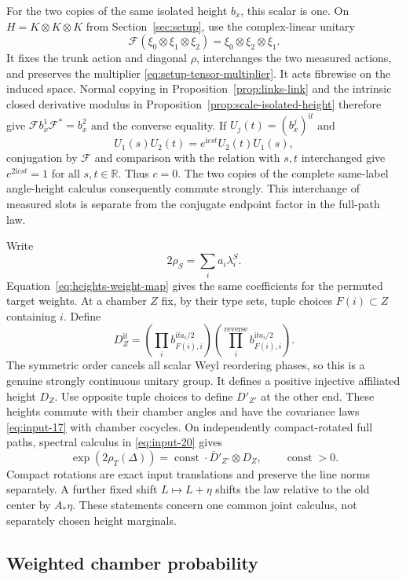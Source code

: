 For the two copies of the same isolated height $b_x$, this scalar is one.
On $H=K\otimes K\otimes K$ from Section~\ref{sec:setup}, use the
complex-linear unitary
\[
 \mathcal F(\xi_0\otimes\xi_1\otimes\xi_2)
   =\xi_0\otimes\xi_2\otimes\xi_1.
\]
It fixes the trunk action and diagonal $\rho$, interchanges the two
measured actions, and preserves the multiplier
\eqref{eq:setup-tensor-multiplier}. It acts fibrewise on the induced
space. Normal copying in Proposition~\ref{prop:links-link} and the
intrinsic closed derivative modulus in
Proposition~\ref{prop:scale-isolated-height} therefore give
$\mathcal F b_x^1\mathcal F^*=b_x^2$ and the converse equality.
If $U_j(t)=(b_x^j)^{\mathrm it}$ and
\[
 U_1(s)U_2(t)=e^{\mathrm icst}U_2(t)U_1(s),
\]
conjugation by $\mathcal F$ and comparison with the relation with $s,t$
interchanged give $e^{2\mathrm icst}=1$ for all $s,t\in\mathbb R$.
Thus $c=0$. The two copies of the complete same-label angle-height
calculus consequently commute strongly. This interchange of measured
slots is separate from the conjugate endpoint factor in the full-path
law.

Write
\[
 2\rho_S=\sum_i a_i\lambda_i^S.
\]
Equation~\eqref{eq:heights-weight-map} gives the same coefficients for the
permuted target weights.  At a chamber $Z$ fix, by their type sets, tuple
choices $F(i)\subset Z$ containing $i$.  Define
\[
 D_Z^{\mathrm it}=
 \left(\prod_i b_{F(i),i}^{\mathrm it a_i/2}\right)
 \left(\prod_i^{\mathrm{reverse}} b_{F(i),i}^{\mathrm it a_i/2}\right).
\]
The symmetric order cancels all scalar Weyl reordering phases, so this is
a genuine strongly continuous unitary group.  It defines a positive
injective affiliated height $D_Z$.  Use opposite tuple choices to define
$D'_{Z'}$ at the other end.  These heights commute with their chamber
angles and have the covariance laws \eqref{eq:input-17} with chamber
cocycles.  On independently compact-rotated full paths, spectral calculus
in \eqref{eq:input-20} gives
\begin{equation}\label{eq:input-21}
 \exp(2\rho_T(\Delta))
 =\operatorname{const}\cdot\bar D'_{Z'}\otimes D_Z,
 \qquad \operatorname{const}>0.
\end{equation}
Compact rotations are exact input translations and preserve the line
norms separately.  A further fixed shift $L\mapsto L+\eta$ shifts the
law relative to the old center by $A_*\eta$.  These statements concern
one common joint calculus, not separately chosen height marginals.

\subsection{Weighted chamber probability}

